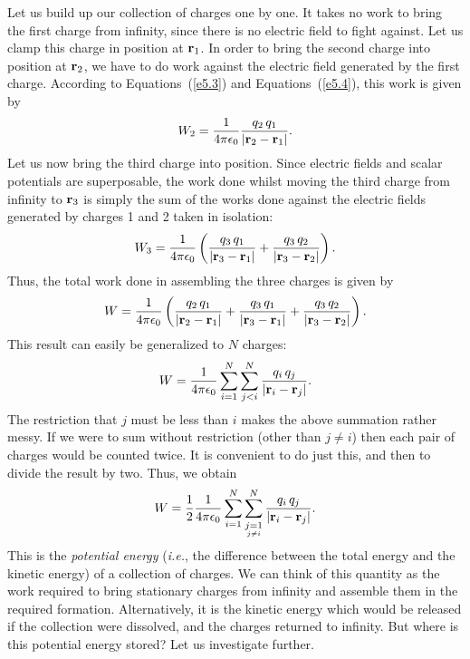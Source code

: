 Let us build up our collection of charges one by one. It takes no work to bring the
first charge from infinity, since there is no electric field to fight against.
Let us clamp this charge in position at ${\bf r}_1$. In order to bring the
second charge into position at ${\bf r}_2$,
 we have to do work against the electric field
generated by the first charge. According to Equations~(\ref{e5.3}) and Equations~(\ref{e5.4}),
 this work is given by
\begin{equation}\label{e5.5}
W_2 = \frac{1}{4\pi\epsilon_0} \frac{q_2 \,q_1}{|{\bf r}_2 - {\bf r}_1|}.
\end{equation}
Let us now bring the third charge into position. Since electric fields
and scalar potentials  are
superposable, the work done whilst moving the third charge from infinity to ${\bf r}_3$
is simply the sum of the works done against the electric fields generated by
charges 1 and 2 taken in isolation:
\begin{equation}
W_3 = \frac{1}{4\pi\epsilon_0} \left( \frac{q_3\, q_1}{|{\bf r}_3 - {\bf r}_1|}
+ \frac{q_3\, q_2}{|{\bf r}_3 - {\bf r}_2|}\right).
\end{equation}
Thus, the total work done in assembling the three charges is given by
\begin{equation}
W = \frac{1}{4\pi\epsilon_0}\left( \frac{q_2 \,q_1}{|{\bf r}_2 - {\bf r}_1|}
+\frac{q_3\, q_1}{|{\bf r}_3 - {\bf r}_1|}
+ \frac{q_3 \,q_2}{|{\bf r}_3 - {\bf r}_2|}\right).
\end{equation}
This result can easily be generalized to $N$ charges:
\begin{equation}
W = \frac{1}{4\pi\epsilon_0} \sum_{i=1}^N \sum_{j<i}^N\frac{q_i \,q_j}{|{\bf r}_i
-{\bf r}_j|}.
\end{equation}
The restriction that $j$ must be less than $i$ makes the above summation
rather messy. If we were to sum without restriction (other than $j\neq i$) then
each pair of charges would be counted twice. It is convenient to do just
this, and then to divide the result by two. Thus, we obtain
\begin{equation}\label{e5.9}
W =\frac{1}{2} \frac{1}{4\pi\epsilon_0} \sum_{i=1}^N \sum_{
\stackrel{\scriptstyle j=1}{\scriptscriptstyle j\neq i}}^N
\frac{q_i\, q_j}{|{\bf r}_i-{\bf r}_j|}.
\end{equation}
This is the {\em potential energy}\/ ({\em i.e.}, the difference between the total energy
and the kinetic energy) of a collection of charges. We can think of this quantity as the
work required  to bring stationary charges from infinity and assemble them in the
required formation. Alternatively, it is the kinetic energy which would
be released if the collection were dissolved, and  the charges returned to infinity.
But where is this potential energy stored? Let us investigate further.

